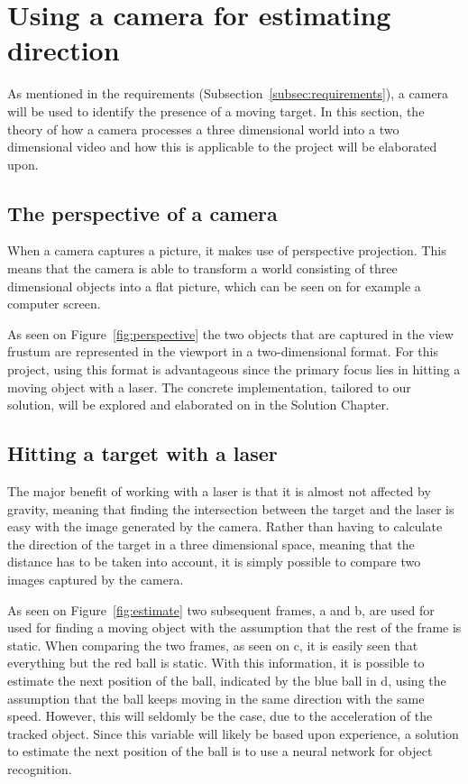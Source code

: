 \section{Using a camera for estimating direction}
As mentioned in the requirements (Subsection~\ref{subsec:requirements}), a camera will be used to identify the presence of a moving target.
In this section, the theory of how a camera processes a three dimensional world into a two dimensional video and how this is applicable to the project will be elaborated upon.

\subsection{The perspective of a camera}
When a camera captures a picture, it makes use of perspective projection.
This means that the camera is able to transform a world consisting of three dimensional objects into a flat picture, which can be seen on for example a computer screen.


As seen on Figure~\ref{fig:perspective} the two objects that are captured in the view frustum are represented in the viewport in a two-dimensional format.
For this project, using this format is advantageous since the primary focus lies in hitting a moving object with a laser.
The concrete implementation, tailored to our solution, will be explored and elaborated on in the Solution Chapter.

\subsection{Hitting a target with a laser}
The major benefit of working with a laser is that it is almost not affected by gravity, meaning that finding the intersection between the target and the laser is easy with the image generated by the camera.
Rather than having to calculate the direction of the target in a three dimensional space, meaning that the distance has to be taken into account, it is simply possible to compare two images captured by the camera.

As seen on Figure~\ref{fig:estimate} two subsequent frames, a and b, are used for used for finding a moving object with the assumption that the rest of the frame is static. 
When comparing the two frames, as seen on c, it is easily seen that everything but the red ball is static.
With this information, it is possible to estimate the next position of the ball, indicated by the blue ball in d, using the assumption that the ball keeps moving in the same direction with the same speed.
However, this will seldomly be the case, due to the acceleration of the tracked object.
Since this variable will likely be based upon experience, a solution to estimate the next position of the ball is to use a neural network for object recognition.

